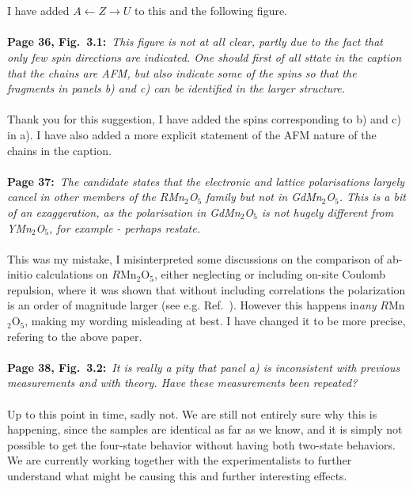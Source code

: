 \documentclass[phd, titlesmallcaps,foronline,oneside]{SNSthesis}
\begin{document}
\\\\
I have added $A \leftarrow Z \rightarrow U$ to this and the following figure.
\\\\
{\bf Page 36, Fig.~3.1:}~{\it This figure is not at all clear, partly due to the fact that only few spin directions are indicated. One should first of all sttate in the caption that the chains are AFM, but also indicate some of the spins so that the fragments in panels b) and c) can be identified in the larger structure.}
\\\\
Thank you for this suggestion, I have added the spins corresponding to b) and c) in a).
I have also added a more explicit statement of the AFM nature of the chains in the caption.
\\\\
{\bf Page 37:}~{\it The candidate states that the electronic and lattice polarisations largely cancel in other members of the $R$Mn$_2$O$_5$ family but not in GdMn$_2$O$_5$. This is a bit of an exaggeration, as the polarisation in GdMn$_2$O$_5$ is not hugely different from YMn$_2$O$_5$, for example - perhaps restate.}
\\\\
This was my mistake, I misinterpreted some discussions on the comparison of ab-initio calculations on $R$Mn$_2$O$_5$, either neglecting or including on-site Coulomb repulsion, where it was shown that without including correlations the polarization is an order of magnitude larger (see e.g. Ref.~\cite{Giovannetti2008}). However this happens in{\it any} $R$Mn$_2$O$_5$, making my wording misleading at best. I have changed it to be more precise, refering to the above paper. 
\\\\
{\bf Page 38, Fig.~3.2:}~{\it It is really a pity that panel a) is inconsistent with previous measurements and with theory. Have these measurements been repeated?}
\\\\
Up to this point in time, sadly not. We are still not entirely sure why this is happening, since the samples are identical as far as we know, and it is simply not possible to get the four-state behavior without having both two-state behaviors. We are currently working together with the experimentalists to further understand what might be causing this and further interesting effects.
\\\\
\end{document}

